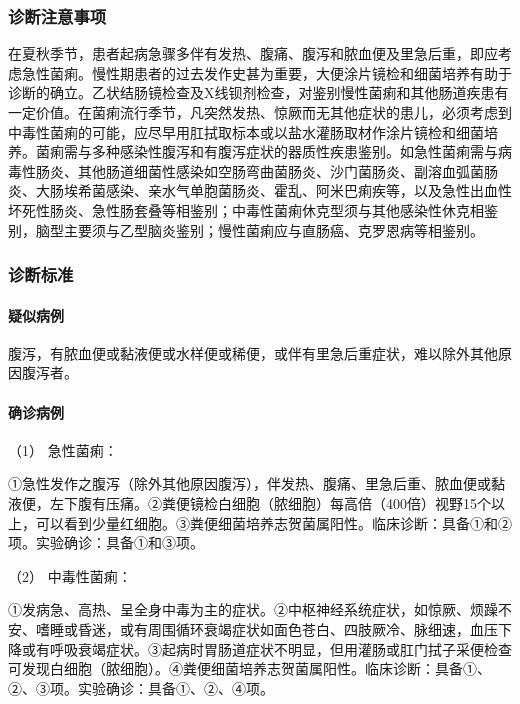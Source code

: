 \subsubsection{诊断注意事项}

在夏秋季节，患者起病急骤多伴有发热、腹痛、腹泻和脓血便及里急后重，即应考虑急性菌痢。慢性期患者的过去发作史甚为重要，大便涂片镜检和细菌培养有助于诊断的确立。乙状结肠镜检查及X线钡剂检查，对鉴别慢性菌痢和其他肠道疾患有一定价值。在菌痢流行季节，凡突然发热、惊厥而无其他症状的患儿，必须考虑到中毒性菌痢的可能，应尽早用肛拭取标本或以盐水灌肠取材作涂片镜检和细菌培养。菌痢需与多种感染性腹泻和有腹泻症状的器质性疾患鉴别。如急性菌痢需与病毒性肠炎、其他肠道细菌性感染如空肠弯曲菌肠炎、沙门菌肠炎、副溶血弧菌肠炎、大肠埃希菌感染、亲水气单胞菌肠炎、霍乱、阿米巴痢疾等，以及急性出血性坏死性肠炎、急性肠套叠等相鉴别；中毒性菌痢休克型须与其他感染性休克相鉴别，脑型主要须与乙型脑炎鉴别；慢性菌痢应与直肠癌、克罗恩病等相鉴别。

\subsubsection{诊断标准}

\paragraph{疑似病例}

腹泻，有脓血便或黏液便或水样便或稀便，或伴有里急后重症状，难以除外其他原因腹泻者。

\paragraph{确诊病例}

\hypertarget{text00227.htmlux5cux23CHP7-9-2-4-2-1}{}
（1） 急性菌痢：

①急性发作之腹泻（除外其他原因腹泻），伴发热、腹痛、里急后重、脓血便或黏液便，左下腹有压痛。②粪便镜检白细胞（脓细胞）每高倍（400倍）视野15个以上，可以看到少量红细胞。③粪便细菌培养志贺菌属阳性。临床诊断：具备①和②项。实验确诊：具备①和③项。

\hypertarget{text00227.htmlux5cux23CHP7-9-2-4-2-2}{}
（2） 中毒性菌痢：

①发病急、高热、呈全身中毒为主的症状。②中枢神经系统症状，如惊厥、烦躁不安、嗜睡或昏迷，或有周围循环衰竭症状如面色苍白、四肢厥冷、脉细速，血压下降或有呼吸衰竭症状。③起病时胃肠道症状不明显，但用灌肠或肛门拭子采便检查可发现白细胞（脓细胞）。④粪便细菌培养志贺菌属阳性。临床诊断：具备①、②、③项。实验确诊：具备①、②、④项。

